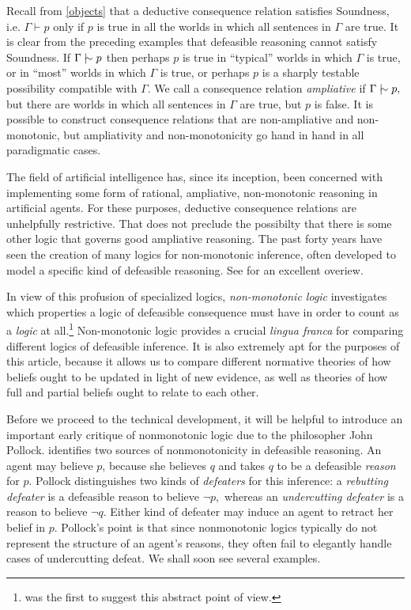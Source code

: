 Recall from \autoref{objects} that a deductive consequence relation satisfies
Soundness, i.e. $\Gamma \vdash p$ only if $p$ is true in all the worlds in which
all sentences in $\Gamma$ are true. It is clear from the preceding examples that
defeasible reasoning cannot satisfy Soundness. If $\Gamma \mathrel{\mid\hspace{-.08em}\!\sim} p$ then perhaps
$p$ is true in ``typical'' worlds in which $\Gamma$ is true, or in ``most''
worlds in which $\Gamma$ is true, or perhaps $p$ is a sharply testable
possibility compatible with $\Gamma$. We call a consequence relation  {\em
ampliative} if $\Gamma \mathrel{\mid\hspace{-.08em}\!\sim} p,$ but there are worlds in which all sentences in
$\Gamma$ are true, but $p$ is false. It is possible to construct consequence
relations that are non-ampliative and non-monotonic, but ampliativity and
non-monotonicity go hand in hand in all paradigmatic cases.  

The field of artificial intelligence has, since its inception, been concerned
with implementing some form of rational, ampliative, non-monotonic reasoning in
artificial agents. For these purposes, deductive consequence relations are
unhelpfully restrictive. That does not preclude the possibilty that there is
some other logic that governs good ampliative reasoning. The past forty years
have seen the creation of many logics for non-monotonic inference, often
developed to model a specific kind of defeasible reasoning. See
\citet{sep-logic-nonmonotonic} for an excellent overiew.

In view of this profusion of specialized logics, {\em non-monotonic logic}
investigates which properties a logic of defeasible consequence must have in
order to count as a {\em logic} at all.\footnote{\citet{gabbay1985theoretical}
was the first to suggest this abstract point of view.} Non-monotonic logic
provides a crucial {\em lingua franca} for comparing different logics of
defeasible inference. It is also extremely apt for the purposes of this article,
because it allows us to compare different normative theories of how beliefs
ought to be updated in light of new evidence, as well as theories of how full
and partial beliefs ought to relate to each other.  

Before we proceed to the technical development, it will be helpful to introduce
an important early critique of nonmonotonic logic due to the philosopher John
Pollock. \citet{pollock1987defeasible} identifies two sources of nonmonotonicity
in defeasible reasoning. An agent may believe $p$, because she believes $q$ and
takes $q$ to be a defeasible {\em reason} for $p$. Pollock distinguishes two
kinds of {\em defeaters} for this inference: a {\em rebutting defeater} is a
defeasible reason to believe $\neg p,$ whereas an {\em undercutting defeater} is
a reason to believe $\neg q$. Either kind of defeater may induce an agent to
retract her belief in $p$. Pollock's point is that since nonmonotonic logics
typically do not represent the structure of an agent's reasons, they often fail
to elegantly handle cases of undercutting defeat. We shall soon see several
examples. 

